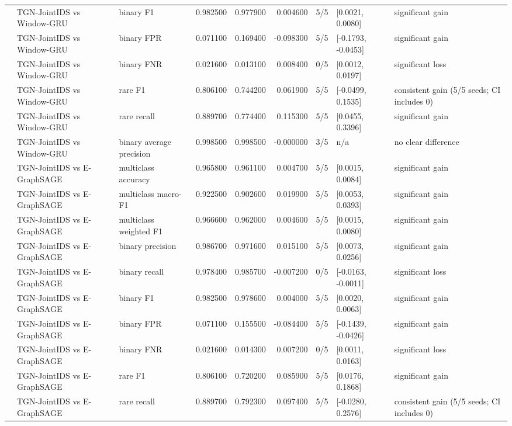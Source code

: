 \begin{table}
\begin{tabular}{lllrrrlll}
 & TGN-JointIDS vs Window-GRU & binary F1 & 0.982500 & 0.977900 & 0.004600 & 5/5 & [0.0021, 0.0080] & significant gain \\
 & TGN-JointIDS vs Window-GRU & binary FPR & 0.071100 & 0.169400 & -0.098300 & 5/5 & [-0.1793, -0.0453] & significant gain \\
 & TGN-JointIDS vs Window-GRU & binary FNR & 0.021600 & 0.013100 & 0.008400 & 0/5 & [0.0012, 0.0197] & significant loss \\
 & TGN-JointIDS vs Window-GRU & rare F1 & 0.806100 & 0.744200 & 0.061900 & 5/5 & [-0.0499, 0.1535] & consistent gain (5/5 seeds; CI includes 0) \\
 & TGN-JointIDS vs Window-GRU & rare recall & 0.889700 & 0.774400 & 0.115300 & 5/5 & [0.0455, 0.3396] & significant gain \\
 & TGN-JointIDS vs Window-GRU & binary average precision & 0.998500 & 0.998500 & -0.000000 & 3/5 & n/a & no clear difference \\
 & TGN-JointIDS vs E-GraphSAGE & multiclass accuracy & 0.965800 & 0.961100 & 0.004700 & 5/5 & [0.0015, 0.0084] & significant gain \\
 & TGN-JointIDS vs E-GraphSAGE & multiclass macro-F1 & 0.922500 & 0.902600 & 0.019900 & 5/5 & [0.0053, 0.0393] & significant gain \\
 & TGN-JointIDS vs E-GraphSAGE & multiclass weighted F1 & 0.966600 & 0.962000 & 0.004600 & 5/5 & [0.0015, 0.0080] & significant gain \\
 & TGN-JointIDS vs E-GraphSAGE & binary precision & 0.986700 & 0.971600 & 0.015100 & 5/5 & [0.0073, 0.0256] & significant gain \\
 & TGN-JointIDS vs E-GraphSAGE & binary recall & 0.978400 & 0.985700 & -0.007200 & 0/5 & [-0.0163, -0.0011] & significant loss \\
 & TGN-JointIDS vs E-GraphSAGE & binary F1 & 0.982500 & 0.978600 & 0.004000 & 5/5 & [0.0020, 0.0063] & significant gain \\
 & TGN-JointIDS vs E-GraphSAGE & binary FPR & 0.071100 & 0.155500 & -0.084400 & 5/5 & [-0.1439, -0.0426] & significant gain \\
 & TGN-JointIDS vs E-GraphSAGE & binary FNR & 0.021600 & 0.014300 & 0.007200 & 0/5 & [0.0011, 0.0163] & significant loss \\
 & TGN-JointIDS vs E-GraphSAGE & rare F1 & 0.806100 & 0.720200 & 0.085900 & 5/5 & [0.0176, 0.1868] & significant gain \\
 & TGN-JointIDS vs E-GraphSAGE & rare recall & 0.889700 & 0.792300 & 0.097400 & 5/5 & [-0.0280, 0.2576] & consistent gain (5/5 seeds; CI includes 0) \\

\end{tabular}
\end{table}
